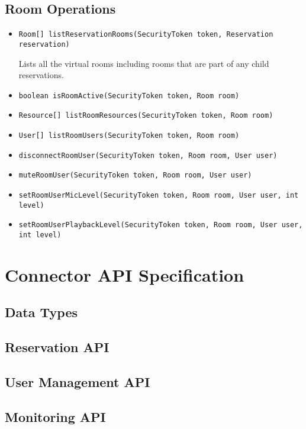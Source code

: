 \documentclass[a4paper]{report}
\newcommand{\APIcode}[1]{\lstinline[style=myinline]!#1!}
\newcommand{\APIcmd}[1]{%
\item \APIcode{#1}%

}
\newenvironment{APIdef}{\begin{itemize}}{\end{itemize}}
\begin{document}
\section{Room Operations}

\begin{APIdef}

\APIcmd{Room[] listReservationRooms(SecurityToken token, Reservation reservation)}

Lists all the virtual rooms including rooms that are part of any child reservations.

\APIcmd{boolean isRoomActive(SecurityToken token, Room room)}

\APIcmd{Resource[] listRoomResources(SecurityToken token, Room room)}

\APIcmd{User[] listRoomUsers(SecurityToken token, Room room)}

\APIcmd{disconnectRoomUser(SecurityToken token, Room room, User user)}

\APIcmd{muteRoomUser(SecurityToken token, Room room, User user)}

\APIcmd{setRoomUserMicLevel(SecurityToken token, Room room, User user, int level)}

\APIcmd{setRoomUserPlaybackLevel(SecurityToken token, Room room, User user, int level)}

\end{APIdef}


\chapter{Connector API Specification}

\section{Data Types}

\section{Reservation API}

\section{User Management API}

\section{Monitoring API}
\end{document}

